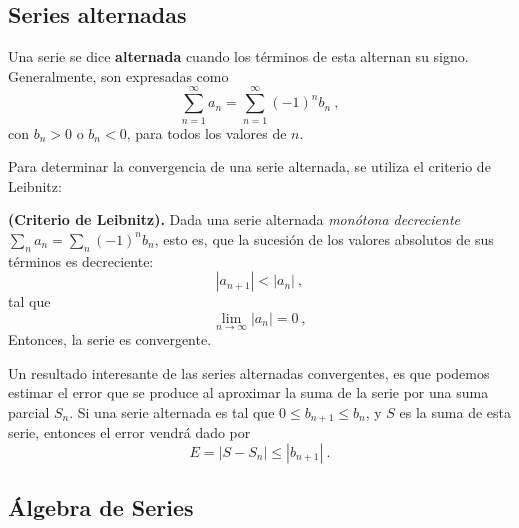 \subsection{Series alternadas}

\begin{defi}
    Una serie se dice \textbf{alternada} cuando los términos de esta alternan su signo. Generalmente, son expresadas como 
    \begin{equation}
        \sum_{n=1}^\infty a_n = \sum_{n=1}^\infty (-1)^n b_n \ ,
    \end{equation}
    con $b_n > 0$ o $b_n < 0$, para todos los valores de $n$.
\end{defi}

Para determinar la convergencia de una serie alternada, se utiliza el criterio de Leibnitz:
\begin{teorema}{\textbf{(Criterio de Leibnitz).}}
    Dada una serie alternada \emph{monótona decreciente} $\sum\limits_n a_n = \sum\limits_n (-1)^n b_n$, esto es, que la sucesión de los valores absolutos de sus términos es decreciente:
    \begin{equation*}
        |a_{n+1}| < |a_n| \ ,
    \end{equation*}
    tal que 
    \begin{equation*}
        \lim_{n \to \infty} |a_n| = 0 \ ,
    \end{equation*}
    Entonces, la serie es convergente.
\end{teorema}

Un resultado interesante de las series alternadas convergentes, es que podemos estimar el error que se produce al aproximar la suma de la serie por una suma parcial $S_n$. Si una serie alternada es tal que $0 \leq b_{n+1} \leq b_n$, y $S$ es la suma de esta serie, entonces el error vendrá dado por 
\begin{equation}
    E = |S - S_n| \leq |b_{n+1}| \ .
\end{equation}

\subsection{Álgebra de Series}

